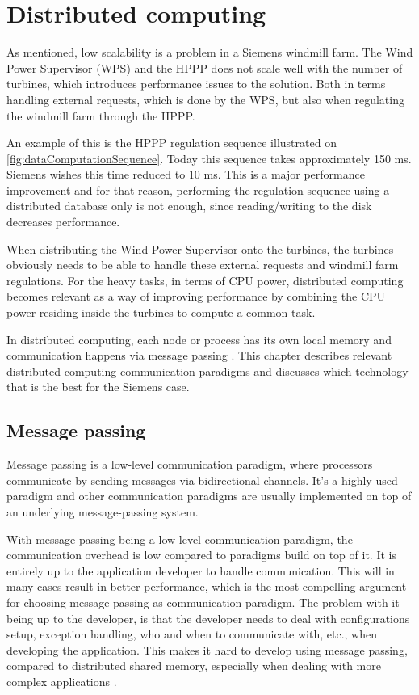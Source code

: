 \chapter{Distributed computing}
As mentioned, low scalability is a problem in a Siemens windmill farm. The Wind Power Supervisor (WPS) and the HPPP does not scale well with the number of turbines, which introduces performance issues to the solution. Both in terms handling external requests, which is done by the WPS, but also when regulating the windmill farm through the HPPP. 

An example of this is the HPPP regulation sequence illustrated on \cref{fig:dataComputationSequence}. Today this sequence takes approximately 150 ms. Siemens wishes this time reduced to 10 ms. This is a major performance improvement and for that reason, performing the regulation sequence using a distributed database only is not enough, since reading/writing to the disk decreases performance.

When distributing the Wind Power Supervisor onto the turbines, the turbines obviously needs to be able to handle these external requests and windmill farm regulations. For the heavy tasks, in terms of CPU power, distributed computing becomes relevant as a way of improving performance by combining the CPU power residing inside the turbines to compute a common task.

In distributed computing, each node or process has its own local memory and communication happens via message passing \cite{andrews2000foundations}. This chapter describes relevant distributed computing communication paradigms and discusses which technology that is the best for the Siemens case. 


\section{Message passing}

Message passing is a low-level communication paradigm, where processors communicate by sending messages via bidirectional channels. It's a highly used paradigm and other communication paradigms are usually implemented on top of an underlying message-passing system.  

With message passing being a low-level communication paradigm, the communication overhead is low compared to paradigms build on top of it. It is entirely up to the application developer to handle communication. This will in many cases result in better performance, which is the most compelling argument for choosing message passing as communication paradigm. The problem with it being up to the developer, is that the developer needs to deal with configurations setup, exception handling, who and when to communicate with, etc., when developing the application. This makes it hard to develop using message passing, compared to distributed shared memory, especially when dealing with more complex applications \cite{lu1995message}. 



